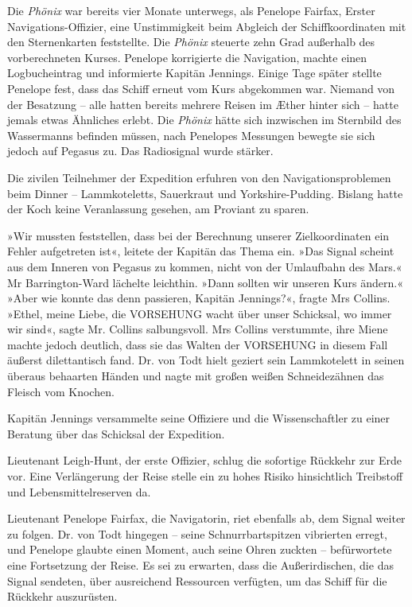 \tb

Die \textit{Phönix} war bereits vier Monate unterwegs, als Penelope Fairfax,
Erster Navigations-Offizier, eine Unstimmigkeit beim Abgleich der
Schiffkoordinaten mit den Sternenkarten feststellte. Die \textit{Phönix}
steuerte zehn Grad außerhalb des vorberechneten Kurses. Penelope
korrigierte die Navigation, machte einen Logbucheintrag und
informierte Kapitän Jennings. Einige Tage später stellte Penelope
fest, dass das Schiff erneut vom Kurs abgekommen war. Niemand von
der Besatzung – alle hatten bereits mehrere Reisen im Æther hinter
sich – hatte jemals etwas Ähnliches erlebt. Die \textit{Phönix} hätte sich
inzwischen im Sternbild des Wassermanns befinden müssen, nach
Penelopes Messungen bewegte sie sich jedoch auf Pegasus zu. Das
Radiosignal wurde stärker.

\bigpar

Die zivilen Teilnehmer der Expedition erfuhren von den
Navigationsproblemen beim Dinner – Lammkoteletts, Sauerkraut und
Yorkshire-Pudding. Bislang hatte der Koch keine Veranlassung
gesehen, am Proviant zu sparen.

»Wir mussten feststellen, dass bei der Berechnung unserer
Zielkoordinaten ein Fehler aufgetreten ist«, leitete der Kapitän
das Thema ein. »Das Signal scheint aus dem Inneren von Pegasus zu
kommen, nicht von der Umlaufbahn des Mars.« Mr Barrington-Ward
lächelte leichthin. »Dann sollten wir unseren Kurs ändern.« »Aber
wie konnte das denn passieren, Kapitän Jennings?«, fragte Mrs
Collins. »Ethel, meine Liebe, die VORSEHUNG wacht über unser
Schicksal, wo immer wir sind«, sagte Mr. Collins salbungsvoll. Mrs
Collins verstummte, ihre Miene machte jedoch deutlich, dass sie das
Walten der VORSEHUNG in diesem Fall äußerst dilettantisch fand. Dr.
von Todt hielt geziert sein Lammkotelett in seinen überaus
behaarten Händen und nagte mit großen weißen Schneidezähnen das
Fleisch vom Knochen.

\bigpar

Kapitän Jennings versammelte seine Offiziere und die
Wissenschaftler zu einer Beratung über das Schicksal der
Expedition.

Lieutenant Leigh-Hunt, der erste Offizier, schlug die sofortige
Rückkehr zur Erde vor. Eine Verlängerung der Reise stelle ein zu
hohes Risiko hinsichtlich Treibstoff und Lebensmittelreserven da.

Lieutenant Penelope Fairfax, die Navigatorin, riet ebenfalls ab,
dem Signal weiter zu folgen. Dr. von Todt hingegen – seine
Schnurrbartspitzen vibrierten erregt, und Penelope glaubte einen
Moment, auch seine Ohren zuckten – befürwortete eine Fortsetzung
der Reise. Es sei zu erwarten, dass die Außerirdischen, die das
Signal sendeten, über ausreichend Ressourcen verfügten, um das
Schiff für die Rückkehr auszurüsten.

